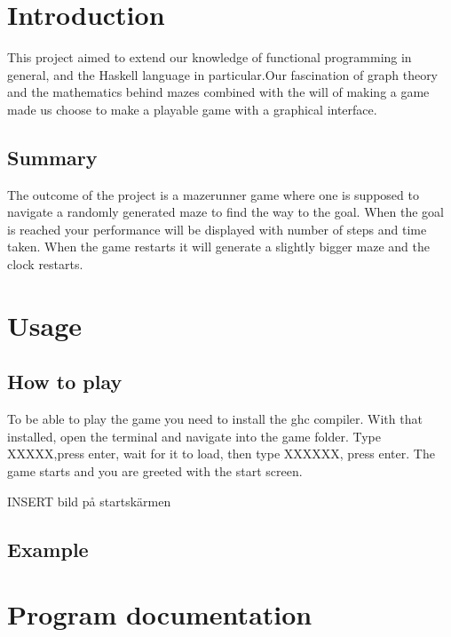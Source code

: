 \documentclass[12pt, a4paper]{article}
\begin{document}
\maketitle

\newpage


\tableofcontents


\newpage
\section{Introduction}
This project aimed to extend our knowledge of functional programming in general, and the Haskell language in particular.Our fascination of graph theory and the mathematics behind mazes combined with the will of making a game made us choose to make a playable game with a graphical interface.


\subsection{Summary}
The outcome of the project is a mazerunner game where one is supposed to navigate a randomly generated maze to find the way to the goal. When the goal is reached your performance will be displayed with number of steps and time taken. When the game restarts it will generate a slightly bigger maze and the clock restarts.


\section{Usage}
\subsection{How to play}
To be able to play the game you need to install the ghc compiler. With that installed, open the terminal and navigate into the game folder. Type XXXXX,press enter, wait for it to load, then type XXXXXX, press enter. The game starts and you are greeted with the start screen.

INSERT bild på startskärmen

\subsection{Example}


\newpage
\section{Program documentation}
\end{document}
